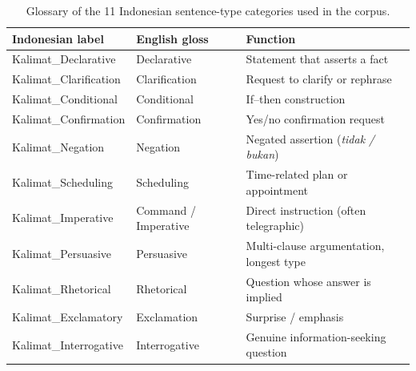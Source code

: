 \begin{table}[!t]
  \centering
  \caption{Glossary of the 11 Indonesian sentence-type categories
           used in the corpus.}
  \label{tab:category_glossary}
  \small
  \begin{tabular}{lll}
  \toprule
  Indonesian label    & English gloss        & Function \\
  \midrule
  Kalimat\_Declarative  & Declarative          & Statement that asserts a fact \\
  Kalimat\_Clarification & Clarification        & Request to clarify or rephrase \\
  Kalimat\_Conditional & Conditional          & If--then construction \\
  Kalimat\_Confirmation  & Confirmation         & Yes/no confirmation request \\
  Kalimat\_Negation      & Negation             & Negated assertion (\emph{tidak / bukan}) \\
  Kalimat\_Scheduling & Scheduling           & Time-related plan or appointment \\
  Kalimat\_Imperative    & Command / Imperative & Direct instruction (often telegraphic) \\
  Kalimat\_Persuasive   & Persuasive           & Multi-clause argumentation, longest type \\
  Kalimat\_Rhetorical     & Rhetorical           & Question whose answer is implied \\
  Kalimat\_Exclamatory      & Exclamation          & Surprise / emphasis \\
  Kalimat\_Interrogative       & Interrogative        & Genuine information-seeking question \\
  \bottomrule
  \end{tabular}
\end{table}
